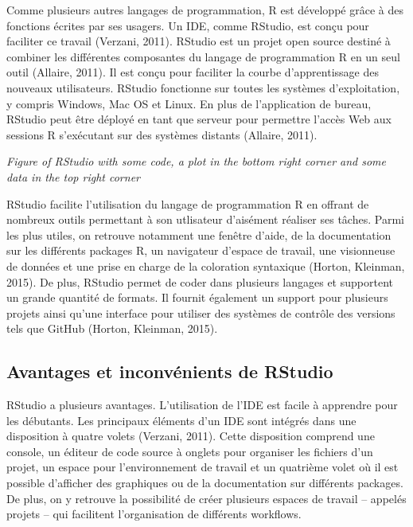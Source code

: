 \documentclass[
  letterpaper,
  DIV=11,
  numbers=noendperiod]{scrreprt}
\begin{document}
Comme plusieurs autres langages de programmation, R est développé grâce
à des fonctions écrites par ses usagers. Un IDE, comme RStudio, est
conçu pour faciliter ce travail (Verzani, 2011). RStudio est un projet
open source destiné à combiner les différentes composantes du langage de
programmation R en un seul outil (Allaire, 2011). Il est conçu pour
faciliter la courbe d'apprentissage des nouveaux utilisateurs. RStudio
fonctionne sur toutes les systèmes d'exploitation, y compris Windows,
Mac OS et Linux. En plus de l'application de bureau, RStudio peut être
déployé en tant que serveur pour permettre l'accès Web aux sessions R
s'exécutant sur des systèmes distants (Allaire, 2011).

\emph{Figure of RStudio with some code, a plot in the bottom right
corner and some data in the top right corner}

RStudio facilite l'utilisation du langage de programmation R en offrant
de nombreux outils permettant à son utlisateur d'aisément réaliser ses
tâches. Parmi les plus utiles, on retrouve notamment une fenêtre d'aide,
de la documentation sur les différents packages R, un navigateur
d'espace de travail, une visionneuse de données et une prise en charge
de la coloration syntaxique (Horton, Kleinman, 2015). De plus, RStudio
permet de coder dans plusieurs langages et supportent un grande quantité
de formats. Il fournit également un support pour plusieurs projets ainsi
qu'une interface pour utiliser des systèmes de contrôle des versions
tels que GitHub (Horton, Kleinman, 2015).

\hypertarget{avantages-et-inconvuxe9nients-de-rstudio}{%
\subsection{Avantages et inconvénients de
RStudio}\label{avantages-et-inconvuxe9nients-de-rstudio}}

RStudio a plusieurs avantages. L'utilisation de l'IDE est facile à
apprendre pour les débutants. Les principaux éléments d'un IDE sont
intégrés dans une disposition à quatre volets (Verzani, 2011). Cette
disposition comprend une console, un éditeur de code source à onglets
pour organiser les fichiers d'un projet, un espace pour l'environnement
de travail et un quatrième volet où il est possible d'afficher des
graphiques ou de la documentation sur différents packages. De plus, on y
retrouve la possibilité de créer plusieurs espaces de travail -- appelés
projets -- qui facilitent l'organisation de différents workflows.
\end{document}
